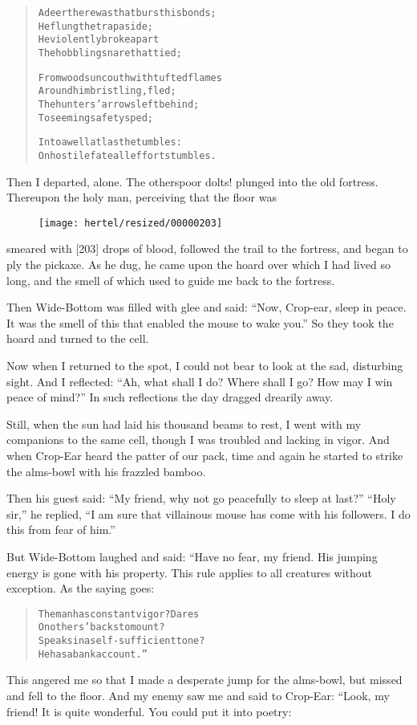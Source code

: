 \documentclass[article, twoside, 10pt]{memoir}
\renewenvironment{verbatim}{%
\begin{quote}%
\vskip -10pt%
\begin{alltt}\normalfont\small}{\end{alltt}%
\end{quote}%
\vskip -10pt
} %
\begin{document}
\begin{verbatim}
A deer there was that burst his bonds;
    He flung the trap aside;
He violently broke apart
    The hobbling snare that tied;

From woods uncouth with tufted flames
    Around him bristling, fled;
The hunters' arrows left behind;
    To seeming safety sped;

Into a well at last he tumbles:
On hostile fate all effort stumbles.
\end{verbatim}
Then I departed, alone. The others{\textemdash}poor dolts! plunged into the
old fortress. Thereupon the holy man, perceiving that the floor was
\begin{figure}[p]\texttt{[image: hertel/resized/00000203]}\end{figure}smeared with [203] drops of blood, followed the trail to the
fortress, and began to ply the pickaxe. As he dug, he came upon the
hoard over which I had lived so long, and the smell of which used
to guide me back to the fortress.

Then Wide-Bottom was filled with glee and said:
``Now, Crop-ear, sleep in peace. It was the smell of this that enabled the mouse to wake you.''
So they took the hoard and turned to the cell.

Now when I returned to the spot, I could not bear to look at the
sad, disturbing sight. And I reflected:
``Ah, what shall I do? Where shall I go? How may I win peace of mind?''
In such reflections the day dragged drearily away.

Still, when the sun had laid his thousand beams to rest, I went
with my companions to the same cell, though I was troubled and
lacking in vigor. And when Crop-Ear heard the patter of our pack,
time and again he started to strike the alms-bowl with his frazzled
bamboo.

Then his guest said:
``My friend, why not go peacefully to sleep at last?''
``Holy sir,'' he replied,
``I am sure that villainous mouse has come with his followers. I do this from fear of him.''

But Wide-Bottom laughed and said: “Have no fear, my friend. His
jumping energy is gone with his property. This rule applies to all
creatures without exception. As the saying goes:

\begin{verbatim}
The man has constant vigor? Dares
    On others' backs to mount?
Speaks in a self-sufficient tone?
    He has a bank account.”
\end{verbatim}
This angered me so that I made a desperate jump for the alms-bowl,
but missed and fell to the floor. And my enemy saw me and said to
Crop-Ear: “Look, my friend! It is quite wonderful. You could put it
into poetry:
\end{document}
